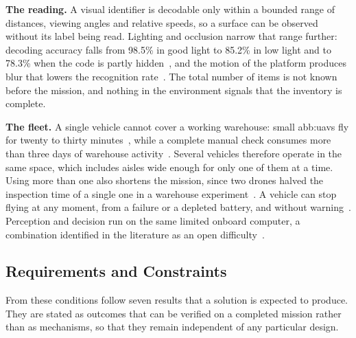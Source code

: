 \textbf{The reading.} A visual identifier is decodable only within a bounded range
of distances, viewing angles and relative speeds, so a surface can be observed
without its label being read. Lighting and occlusion narrow that range further:
decoding accuracy falls from 98.5\% in good light to 85.2\% in low light and to
78.3\% when the code is partly hidden~\cite{alsulami2026deep}, and the motion of
the platform produces blur that lowers the recognition
rate~\cite{dong2024motionblurred}. The total number of items is not known before
the mission, and nothing in the environment signals that the inventory is
complete.

\textbf{The fleet.} A single vehicle cannot cover a working warehouse: small
\glspl{abb:uav} fly for twenty to thirty minutes~\cite{mohsan2023unmanned}, while
a complete manual check consumes more than three days of warehouse
activity~\cite{kalinov2020warevision}. Several vehicles therefore operate in the
same space, which includes aisles wide enough for only one of them at a time.
Using more than one also shortens the mission, since two drones halved the
inspection time of a single one in a warehouse experiment~\cite{pore2026uavqr}. A
vehicle can stop flying at any moment, from a failure or a depleted battery, and
without warning~\cite{chandran2024network}. Perception and decision run on the
same limited onboard computer, a combination identified in the literature as an
open difficulty~\cite{sandino2020autonomous}.

\subsection{Requirements and Constraints}%
\label{subsec:sys:requirements}

From these conditions follow seven results that a solution is expected to
produce. They are stated as outcomes that can be verified on a completed mission
rather than as mechanisms, so that they remain independent of any particular
design.

